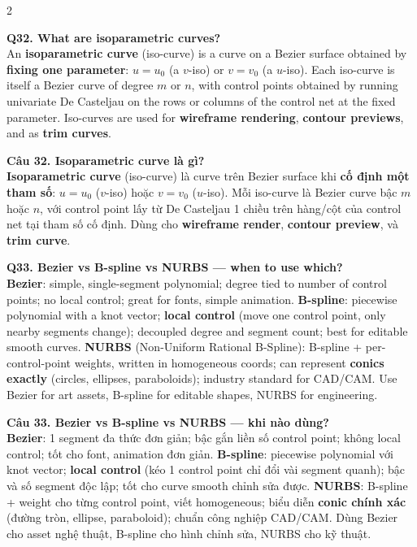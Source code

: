 \begin{paracol}{2}
\switchcolumn*

\textbf{Q32. What are isoparametric curves?}\\
An \textbf{isoparametric curve} (iso-curve) is a curve on a Bezier surface obtained by \textbf{fixing one parameter}: $u=u_0$ (a $v$-iso) or $v=v_0$ (a $u$-iso). Each iso-curve is itself a Bezier curve of degree $m$ or $n$, with control points obtained by running univariate De Casteljau on the rows or columns of the control net at the fixed parameter. Iso-curves are used for \textbf{wireframe rendering}, \textbf{contour previews}, and as \textbf{trim curves}.

\switchcolumn

\textbf{Câu 32. Isoparametric curve là gì?}\\
\textbf{Isoparametric curve} (iso-curve) là curve trên Bezier surface khi \textbf{cố định một tham số}: $u=u_0$ ($v$-iso) hoặc $v=v_0$ ($u$-iso). Mỗi iso-curve là Bezier curve bậc $m$ hoặc $n$, với control point lấy từ De Casteljau 1 chiều trên hàng/cột của control net tại tham số cố định. Dùng cho \textbf{wireframe render}, \textbf{contour preview}, và \textbf{trim curve}.

\switchcolumn*

\textbf{Q33. Bezier vs B-spline vs NURBS — when to use which?}\\
\textbf{Bezier}: simple, single-segment polynomial; degree tied to number of control points; no local control; great for fonts, simple animation.
\textbf{B-spline}: piecewise polynomial with a knot vector; \textbf{local control} (move one control point, only nearby segments change); decoupled degree and segment count; best for editable smooth curves.
\textbf{NURBS} (Non-Uniform Rational B-Spline): B-spline + per-control-point weights, written in homogeneous coords; can represent \textbf{conics exactly} (circles, ellipses, paraboloids); industry standard for CAD/CAM.
Use Bezier for art assets, B-spline for editable shapes, NURBS for engineering.

\switchcolumn

\textbf{Câu 33. Bezier vs B-spline vs NURBS — khi nào dùng?}\\
\textbf{Bezier}: 1 segment đa thức đơn giản; bậc gắn liền số control point; không local control; tốt cho font, animation đơn giản.
\textbf{B-spline}: piecewise polynomial với knot vector; \textbf{local control} (kéo 1 control point chỉ đổi vài segment quanh); bậc và số segment độc lập; tốt cho curve smooth chỉnh sửa được.
\textbf{NURBS}: B-spline + weight cho từng control point, viết homogeneous; biểu diễn \textbf{conic chính xác} (đường tròn, ellipse, paraboloid); chuẩn công nghiệp CAD/CAM.
Dùng Bezier cho asset nghệ thuật, B-spline cho hình chỉnh sửa, NURBS cho kỹ thuật.


\end{paracol}
